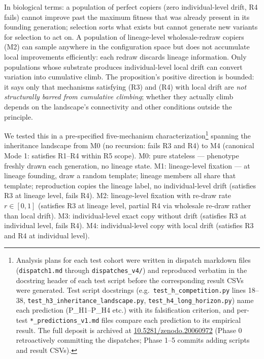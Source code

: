 \documentclass[aps,prx,reprint,amsmath,amssymb,floatfix,superscriptaddress,nofootinbib]{revtex4-2}
\newcommand{\zenodoDOI}{\href{https://doi.org/10.5281/zenodo.20060972}{10.5281/zenodo.20060972}}
\theoremstyle{plain-thm}
\theoremstyle{definition-thm}
\begin{document}
In biological terms: a population of perfect copiers (zero individual-level drift, R4 fails) cannot improve past the maximum fitness that was already present in its founding generation; selection sorts what exists but cannot generate new variants for selection to act on. A population of lineage-level wholesale-redraw copiers (M2) can sample anywhere in the configuration space but does not accumulate local improvements efficiently: each redraw discards lineage information. Only populations whose substrate produces individual-level local drift can convert variation into cumulative climb. The proposition's positive direction is bounded: it says only that mechanisms satisfying (R3) and (R4) with local drift are \emph{not structurally barred from cumulative climbing}; whether they actually climb depends on the landscape's connectivity and other conditions outside the principle.

We tested this in a pre-specified five-mechanism characterization\footnote{Analysis plans for each test cohort were written in dispatch markdown files (\texttt{dispatch1.md} through \texttt{dispatches\_v4/}) and reproduced verbatim in the docstring header of each test script before the corresponding result CSVs were generated. Test script docstrings (e.g.\ \texttt{test\_h\_competition.py} lines 18--38, \texttt{test\_h3\_inheritance\_landscape.py}, \texttt{test\_h4\_long\_horizon.py}) name each prediction (P\_H1--P\_H4 etc.) with its falsification criterion, and per-test \texttt{*\_predictions\_v1.md} files compare each prediction to its empirical result. The full deposit is archived at \zenodoDOI{} (Phase 0 retroactively committing the dispatches; Phase 1--5 commits adding scripts and result CSVs).} spanning the inheritance landscape from M0 (no recursion: fails R3 and R4) to M4 (canonical Mode 1: satisfies R1--R4 within R5 scope). M0: pure stateless --- phenotype freshly drawn each generation, no lineage state. M1: lineage-level fixation --- at lineage founding, draw a random template; lineage members all share that template; reproduction copies the lineage label, no individual-level drift (satisfies R3 at lineage level, fails R4). M2: lineage-level fixation with re-draw rate $r \in [0, 1]$ (satisfies R3 at lineage level, partial R4 via wholesale re-draw rather than local drift). M3: individual-level exact copy without drift (satisfies R3 at individual level, fails R4). M4: individual-level copy with local drift (satisfies R3 and R4 at individual level).
\end{document}
